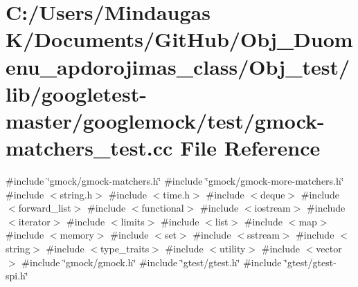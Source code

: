 \hypertarget{_obj__test_2lib_2googletest-master_2googlemock_2test_2gmock-matchers__test_8cc}{}\section{C\+:/\+Users/\+Mindaugas K/\+Documents/\+Git\+Hub/\+Obj\+\_\+\+Duomenu\+\_\+apdorojimas\+\_\+class/\+Obj\+\_\+test/lib/googletest-\/master/googlemock/test/gmock-\/matchers\+\_\+test.cc File Reference}
\label{_obj__test_2lib_2googletest-master_2googlemock_2test_2gmock-matchers__test_8cc}
{\ttfamily \#include \char`\"{}gmock/gmock-\/matchers.\+h\char`\"{}}\newline
{\ttfamily \#include \char`\"{}gmock/gmock-\/more-\/matchers.\+h\char`\"{}}\newline
{\ttfamily \#include $<$string.\+h$>$}\newline
{\ttfamily \#include $<$time.\+h$>$}\newline
{\ttfamily \#include $<$deque$>$}\newline
{\ttfamily \#include $<$forward\+\_\+list$>$}\newline
{\ttfamily \#include $<$functional$>$}\newline
{\ttfamily \#include $<$iostream$>$}\newline
{\ttfamily \#include $<$iterator$>$}\newline
{\ttfamily \#include $<$limits$>$}\newline
{\ttfamily \#include $<$list$>$}\newline
{\ttfamily \#include $<$map$>$}\newline
{\ttfamily \#include $<$memory$>$}\newline
{\ttfamily \#include $<$set$>$}\newline
{\ttfamily \#include $<$sstream$>$}\newline
{\ttfamily \#include $<$string$>$}\newline
{\ttfamily \#include $<$type\+\_\+traits$>$}\newline
{\ttfamily \#include $<$utility$>$}\newline
{\ttfamily \#include $<$vector$>$}\newline
{\ttfamily \#include \char`\"{}gmock/gmock.\+h\char`\"{}}\newline
{\ttfamily \#include \char`\"{}gtest/gtest.\+h\char`\"{}}\newline
{\ttfamily \#include \char`\"{}gtest/gtest-\/spi.\+h\char`\"{}}\newline
